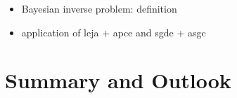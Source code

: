 \begin{itemize}
\item Bayesian inverse problem: definition
\item application of leja + apce and sgde + asgc
\end{itemize}


\chapter{Summary and Outlook}
\label{cha:summary-outlook}



